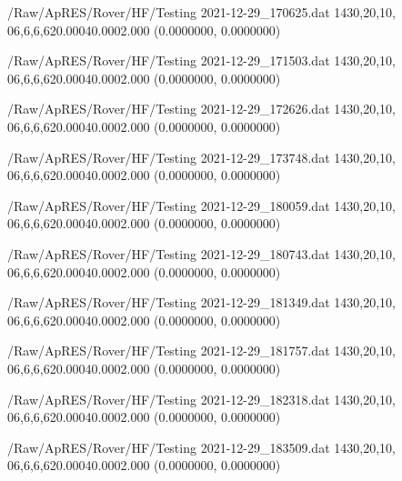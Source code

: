 \hfaprestable
{/Raw/ApRES/Rover/HF/Testing}%
{2021-12-29\_170625.dat}%
{1}{4}{30,20,10, 0}{6,6,6,6}{20.000}{40.000}{2.000}%
{ (0.0000000, 0.0000000)}%
{}%
{}%

\hfaprestable
{/Raw/ApRES/Rover/HF/Testing}%
{2021-12-29\_171503.dat}%
{1}{4}{30,20,10, 0}{6,6,6,6}{20.000}{40.000}{2.000}%
{ (0.0000000, 0.0000000)}%
{}%
{}%

\hfaprestable
{/Raw/ApRES/Rover/HF/Testing}%
{2021-12-29\_172626.dat}%
{1}{4}{30,20,10, 0}{6,6,6,6}{20.000}{40.000}{2.000}%
{ (0.0000000, 0.0000000)}%
{}%
{}%

\hfaprestable
{/Raw/ApRES/Rover/HF/Testing}%
{2021-12-29\_173748.dat}%
{1}{4}{30,20,10, 0}{6,6,6,6}{20.000}{40.000}{2.000}%
{ (0.0000000, 0.0000000)}%
{}%
{}%

\hfaprestable
{/Raw/ApRES/Rover/HF/Testing}%
{2021-12-29\_180059.dat}%
{1}{4}{30,20,10, 0}{6,6,6,6}{20.000}{40.000}{2.000}%
{ (0.0000000, 0.0000000)}%
{}%
{}%

\hfaprestable
{/Raw/ApRES/Rover/HF/Testing}%
{2021-12-29\_180743.dat}%
{1}{4}{30,20,10, 0}{6,6,6,6}{20.000}{40.000}{2.000}%
{ (0.0000000, 0.0000000)}%
{}%
{}%

\hfaprestable
{/Raw/ApRES/Rover/HF/Testing}%
{2021-12-29\_181349.dat}%
{1}{4}{30,20,10, 0}{6,6,6,6}{20.000}{40.000}{2.000}%
{ (0.0000000, 0.0000000)}%
{}%
{}%

\hfaprestable
{/Raw/ApRES/Rover/HF/Testing}%
{2021-12-29\_181757.dat}%
{1}{4}{30,20,10, 0}{6,6,6,6}{20.000}{40.000}{2.000}%
{ (0.0000000, 0.0000000)}%
{}%
{}%

\hfaprestable
{/Raw/ApRES/Rover/HF/Testing}%
{2021-12-29\_182318.dat}%
{1}{4}{30,20,10, 0}{6,6,6,6}{20.000}{40.000}{2.000}%
{ (0.0000000, 0.0000000)}%
{}%
{}%

\hfaprestable
{/Raw/ApRES/Rover/HF/Testing}%
{2021-12-29\_183509.dat}%
{1}{4}{30,20,10, 0}{6,6,6,6}{20.000}{40.000}{2.000}%
{ (0.0000000, 0.0000000)}%
{}%
{}%

